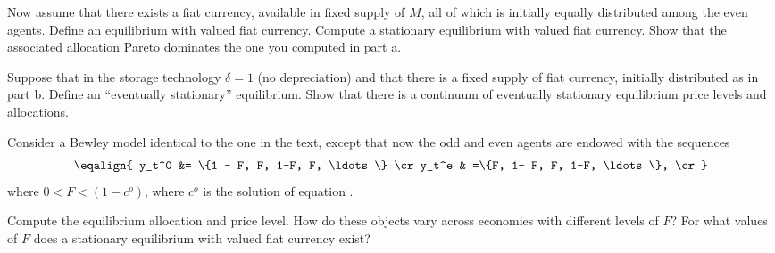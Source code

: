 \medskip
{}  Now assume that there exists a fiat
currency, available in fixed supply of $M$, all of which
is initially equally distributed among the even agents.  Define
an equilibrium with valued fiat currency.  Compute
a stationary equilibrium with valued fiat currency.  Show
that the associated allocation Pareto dominates the one
you computed in part a.

\medskip
{}  Suppose that in the storage technology
$\delta=1$ (no depreciation) and that there is a fixed supply
of fiat currency, initially distributed as in part b.  Define
an ``eventually stationary'' equilibrium.  Show that there
is a continuum of eventually stationary equilibrium price levels
and allocations.

\medskip
{}
\medskip\noindent
Consider a Bewley model identical to the one in the text,
except that now the
 odd and even  agents are endowed with the sequences
$$ \eqalign{ y_t^0 &= \{1 - F, F, 1-F, F, \ldots \} \cr
             y_t^e & =\{F, 1- F, F, 1-F, \ldots \}, \cr }$$
where  $ 0 < F< (1-c^o)$, where $c^o$ is the solution of equation .

   Compute the equilibrium allocation and price level.  How
do these objects vary across economies with different
levels of $F$?  For what values of $F$ does a stationary
equilibrium with valued fiat currency exist?

